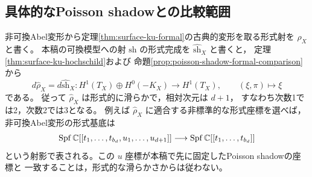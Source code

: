 \subsection{具体的なPoisson shadowとの比較範囲}

非可換Abel変形から定理\ref{thm:surface-ku-formal}の古典的変形を取る形式射を
$\widehat\rho_X$ と書く。
本稿の可換模型への射 $\mathrm{sh}$ の形式完成を
$\widehat{\mathrm{sh}}_X$ と書くと，
定理\ref{thm:surface-ku-hochschild}および
命題\ref{prop:poisson-shadow-formal-comparison}から
\begin{equation}\label{eq:surface-ku-shadow-first-order}
 d\widehat\rho_X=d\widehat{\mathrm{sh}}_X:
 H^1(T_X)\oplus H^0(-K_X)\longrightarrow H^1(T_X),
 \qquad (\xi,\pi)\longmapsto\xi
\end{equation}
である。
従って $\widehat\rho_X$ は形式的に滑らかで，相対次元は $d+1$，
すなわち次数1では2，次数2では3となる。
例えば $\widehat\rho_X$ に適合する非標準的な形式座標を選べば，
非可換Abel変形の形式基底は
\[
 \operatorname{Spf}\mathbb C[[t_1,\ldots,t_{b_d},u_1,\ldots,u_{d+1}]]
 \longrightarrow\operatorname{Spf}\mathbb C[[t_1,\ldots,t_{b_d}]]
\]
という射影で表される。この $u$ 座標が本稿で先に固定したPoisson shadowの座標と
一致することは，形式的な滑らかさからは従わない。

